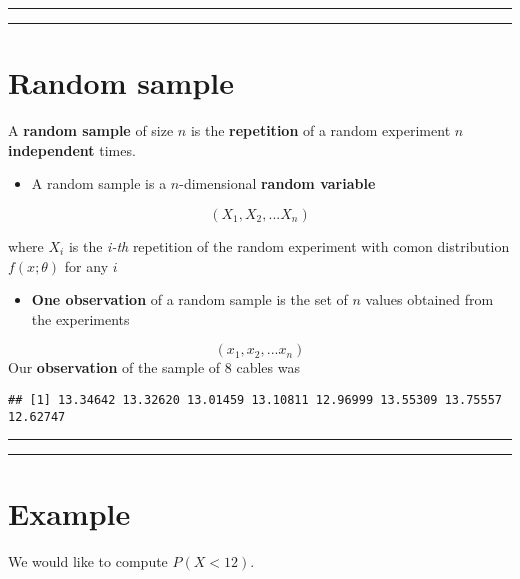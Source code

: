 \documentclass[
]{book}
\providecommand{\tightlist}{%
  \setlength{\itemsep}{0pt}\setlength{\parskip}{0pt}}
\begin{document}
\begin{center}\rule{0.5\linewidth}{0.5pt}\end{center}

\begin{center}\rule{0.5\linewidth}{0.5pt}\end{center}

\hypertarget{random-sample}{%
\section{Random sample}\label{random-sample}}

A \textbf{random sample} of size \(n\) is the \textbf{repetition} of a random experiment \(n\) \textbf{independent} times.

\begin{itemize}
\tightlist
\item
  A random sample is a \(n\)-dimensional \textbf{random variable}
\end{itemize}

\[(X_1, X_2, ... X_n)\]

where \(X_i\) is the \emph{i-th} repetition of the random experiment with comon distribution \(f(x; \theta)\) for any \(i\)

\begin{itemize}
\tightlist
\item
  \textbf{One observation} of a random sample is the set of \(n\) values obtained from the experiments
\end{itemize}

\[(x_1, x_2, ... x_n)\]
Our \textbf{observation} of the sample of \(8\) cables was

\begin{verbatim}
## [1] 13.34642 13.32620 13.01459 13.10811 12.96999 13.55309 13.75557 12.62747
\end{verbatim}

\begin{center}\rule{0.5\linewidth}{0.5pt}\end{center}

\begin{center}\rule{0.5\linewidth}{0.5pt}\end{center}

\hypertarget{example-14}{%
\section{Example}\label{example-14}}

We would like to compute \(P(X<12)\).
\end{document}

